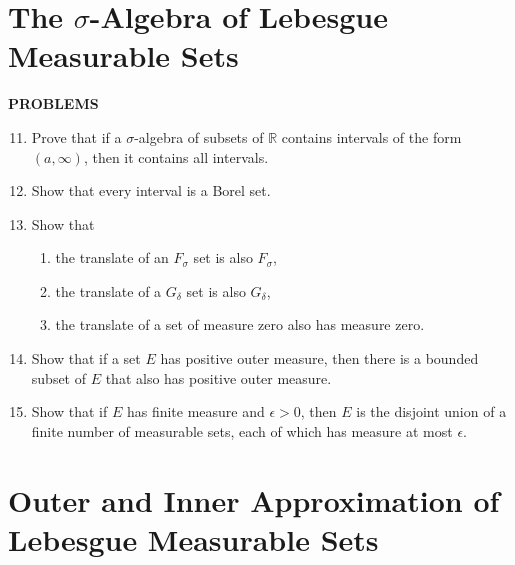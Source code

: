 \section{The $\sigma$-Algebra of Lebesgue Measurable Sets}

\begin{center}
	\textbf{PROBLEMS}
\end{center}
\begin{enumerate}
	\setcounter{enumi}{10}
	\item Prove that if a $\sigma$-algebra of subsets of $\mathbb{R}$ contains intervals of the form $(a,\infty)$, then it contains all intervals.\\
	\item Show that every interval is a Borel set.
	\item Show that 
	\begin{enumerate}[label=(\roman*),align=left]                                                                                                         
        \item the translate of an $F_\sigma$ set is also $F_\sigma$,
        \item the translate of a $G_\delta$ set is also $G_\delta$,
        \item the translate of a set of measure zero also has measure zero.
    \end{enumerate}
    \item Show that if a set $E$ has positive outer measure, then there is a bounded subset of $E$ that also has positive outer measure.
    \item Show that if $E$ has finite measure and $\epsilon>0$, then $E$ is the disjoint union of a finite number of measurable sets, each of which has measure at most $\epsilon$.
\end{enumerate}

\section{Outer and Inner Approximation of Lebesgue Measurable Sets}

